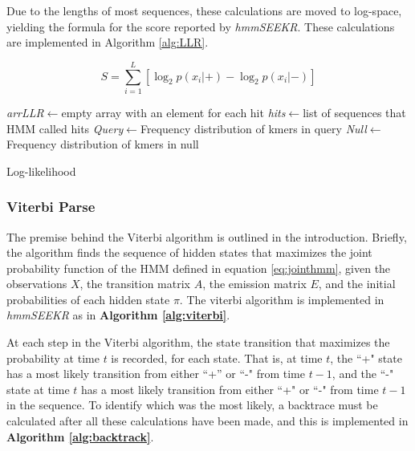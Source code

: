 Due to the lengths of most sequences, these calculations are moved to log-space, yielding the formula for the score reported by \emph{hmmSEEKR}. These calculations are implemented in Algorithm \ref{alg:LLR}.

$$S = \sum_{i=1}^L{\left[\log_2 p(x_i|+)- \log_2 p(x_i|-)\right]}$$
\begin{algorithm}[h]
\DontPrintSemicolon
{}
\SetAlgoLined
\emph{arrLLR}$\leftarrow$empty array with an element for each hit\;
\emph{hits}$\leftarrow$list of sequences that HMM called hits\;
\emph{Query}$\leftarrow$Frequency distribution of kmers in query\;
\emph{Null}$\leftarrow$Frequency distribution of kmers in null\;

 \caption{Log-likelihood}
 \label{alg:LLR}
\end{algorithm}

\subsubsection{Viterbi Parse}

The premise behind the Viterbi algorithm is outlined in the introduction. Briefly, the algorithm finds the sequence of hidden states that maximizes the joint probability function of the HMM defined in equation \ref{eq:jointhmm}, given the observations $X$, the transition matrix $A$, the emission matrix $E$, and the initial probabilities of each hidden state $\pi$. The viterbi algorithm is implemented in \emph{hmmSEEKR} as in \textbf{Algorithm \ref{alg:viterbi}}.

At each step in the Viterbi algorithm, the state transition that maximizes the probability at time $t$ is recorded, for each state. That is, at time $t$, the ``+" state has a most likely transition from either ``+'' or ``-" from time $t-1$, and the ``-" state at time $t$ has a most likely transition from either ``+" or ``-" from time $t-1$ in the sequence. To identify which was the most likely, a backtrace must be calculated after all these calculations have been made, and this is implemented in \textbf{Algorithm \ref{alg:backtrack}}.

